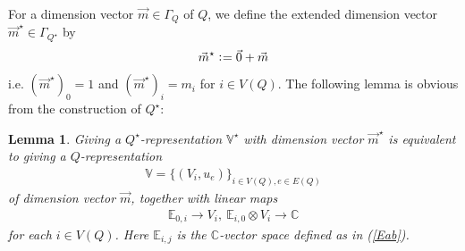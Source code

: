 \documentclass[11pt]{amsart}
\theoremstyle{plain}
\newtheorem{lem}[thm]{Lemma}
\theoremstyle{definition}
\theoremstyle{remark}
\begin{document}
For a dimension vector $\vec{m} \in \Gamma_Q$
of $Q$, we define the extended dimension vector 
$\vec{m}^{\star} \in \Gamma_{Q^{\star}}$ by
\begin{align*}
\vec{m}^{\star} \cneq \vec{0}+\vec{m}
\end{align*}
i.e.
$(\vec{m}^{\star})_0=1$ and 
$(\vec{m}^{\star})_i=m_i$ for $i \in V(Q)$. 
The following lemma is obvious from the 
construction of $Q^{\star}$: 
\begin{lem}\label{lem:obvious}
Giving a $Q^{\star}$-representation $\mathbb{V}^{\star}$
with dimension vector $\vec{m}^{\star}$ is equivalent to 
giving a $Q$-representation 
\begin{align}\label{Qrep:V}
\mathbb{V}=\{(V_i, u_e)\}_{i \in V(Q), e \in E(Q)}
\end{align}
of dimension vector $\vec{m}$, 
together with linear maps
\begin{align}\label{lmaps}
\mathbb{E}_{0, i} \to V_i, \ 
\mathbb{E}_{i, 0} \otimes V_i \to \mathbb{C}
\end{align}
for each $i \in V(Q)$. 
Here 
$\mathbb{E}_{i, j}$ is the $\mathbb{C}$-vector 
space defined as in (\ref{Eab}). 
\end{lem}
\end{document}
